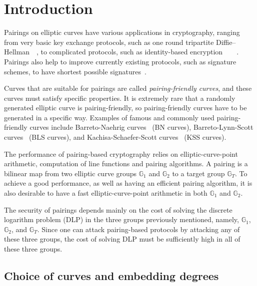 \section{Introduction}
\label{sec:intro}

Pairings on elliptic curves have various applications in cryptography,
ranging from very basic key exchange protocols,
such as one round tripartite Diffie--Hellman~\cite{2000/joux-ants}~\cite{2004/joux-tripartite},
to complicated protocols, such as
identity-based encryption~\cite{2001/boneh}~\cite{2002/horwitz}~\cite{2002/gentry}~\cite{2005/sahai}.
Pairings also help to improve currently existing protocols, 
such as signature schemes, to have shortest possible signatures~\cite{2004/boneh}.

Curves that are suitable for pairings are called {\emph{pairing-friendly curves}},
and these curves must satisfy specific properties.
It is extremely rare that a randomly generated elliptic curve is pairing-friendly,
so pairing-friendly curves have to be generated in a specific way.
Examples of famous and commonly used pairing-friendly curves include 
Barreto-Naehrig curves~\cite{2006/barreto} (BN curves),
Barreto-Lynn-Scott curves~\cite{2003/bls} (BLS curves), and
Kachisa-Schaefer-Scott curves~\cite{2008/kss} (KSS curves).

The performance of pairing-based cryptography relies on
elliptic-curve-point arithmetic, computation of line functions and pairing algorithms.
A pairing is a bilinear map from two elliptic curve groups $\mathbb{G}_1$ and $\mathbb{G}_2$ to
a target group $\mathbb{G}_T$.
To achieve a good performance, as well as having an efficient pairing algorithm,
it is also desirable to have a fast elliptic-curve-point arithmetic in both $\mathbb{G}_1$ and $\mathbb{G}_2$.

The security of pairings depends mainly on the cost of solving the discrete logarithm problem (DLP) in the three groups previously mentioned,
namely, $\mathbb{G}_1$, $\mathbb{G}_2$, and $\mathbb{G}_T$.
Since one can attack pairing-based protocols by attacking any of these three groups,
the cost of solving DLP must be sufficiently high in all of these three groups.


\subsection{Choice of curves and embedding degrees}

